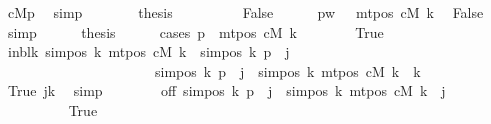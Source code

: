 \begin{isabellebody}
\ cM{}p\ \isamarkupfalse%
\ simp\isanewline
\ \ \ \ \isamarkupfalse%
\ \isamarkupfalse%
\ {\isacharquery}{\kern0pt}thesis\ \isakeywordONE{{\isachardot}{\kern0pt}}\isamarkupfalse%
\isanewline
\ \ \isamarkupfalse%
\isanewline
\ \ \ \ \isamarkupfalse%
\ False\isanewline
\ \ \ \ \isamarkupfalse%
\ pw{}{\isacharcolon}{\kern0pt}\ {\isachardoublequoteopen}{}\ {\isasymle}\ mt{\isacharunderscore}{\kern0pt}pos\ cM\ k{\isachardoublequoteclose}\ \isamarkupfalse%
\ False\ \isamarkupfalse%
\ simp\isanewline
\ \ \ \ \isamarkupfalse%
\ {\isacharquery}{\kern0pt}thesis\isanewline
\ \ \ \ \isamarkupfalse%
\ {\isacharparenleft}{\kern0pt}cases\ {\isachardoublequoteopen}p\ {\isacharequal}{\kern0pt}\ mt{\isacharunderscore}{\kern0pt}pos\ cM\ k{\isachardoublequoteclose}{\isacharparenright}{\kern0pt}\isanewline
\ \ \ \ \ \ \isamarkupfalse%
\ True\isanewline
\ \ \ \ \ \ \isamarkupfalse%
\ inblk{\isacharcolon}{\kern0pt}\ {\isachardoublequoteopen}sim{\isacharunderscore}{\kern0pt}pos\ {\isacharquery}{\kern0pt}k\ {\isacharparenleft}{\kern0pt}mt{\isacharunderscore}{\kern0pt}pos\ cM\ k{\isacharparenright}{\kern0pt}\ {\isasymle}\ sim{\isacharunderscore}{\kern0pt}pos\ {\isacharquery}{\kern0pt}k\ p\ {\isacharplus}{\kern0pt}\ j\isanewline
\ \ \ \ \ \ \ \ \ \ \ \ \ \ \ \ \ \ \ \ \ {\isasymand}\ sim{\isacharunderscore}{\kern0pt}pos\ {\isacharquery}{\kern0pt}k\ p\ {\isacharplus}{\kern0pt}\ j\ {\isacharless}{\kern0pt}\ sim{\isacharunderscore}{\kern0pt}pos\ {\isacharquery}{\kern0pt}k\ {\isacharparenleft}{\kern0pt}mt{\isacharunderscore}{\kern0pt}pos\ cM\ k{\isacharparenright}{\kern0pt}\ {\isacharplus}{\kern0pt}\ {\isacharquery}{\kern0pt}k{\isachardoublequoteclose}\isanewline
\ \ \ \ \ \ \ \ \isamarkupfalse%
\ True\ jk\ \isamarkupfalse%
\ simp\isanewline
\ \ \ \ \ \ \isamarkupfalse%
\ off{\isacharcolon}{\kern0pt}\ {\isachardoublequoteopen}sim{\isacharunderscore}{\kern0pt}pos\ {\isacharquery}{\kern0pt}k\ p\ {\isacharplus}{\kern0pt}\ j\ {\isacharminus}{\kern0pt}\ sim{\isacharunderscore}{\kern0pt}pos\ {\isacharquery}{\kern0pt}k\ {\isacharparenleft}{\kern0pt}mt{\isacharunderscore}{\kern0pt}pos\ cM\ k{\isacharparenright}{\kern0pt}\ {\isacharequal}{\kern0pt}\ j{\isachardoublequoteclose}\isanewline
\ \ \ \ \ \ \ \ \isamarkupfalse%
\ True\ \isamarkupfalse%

\end{isabellebody}

